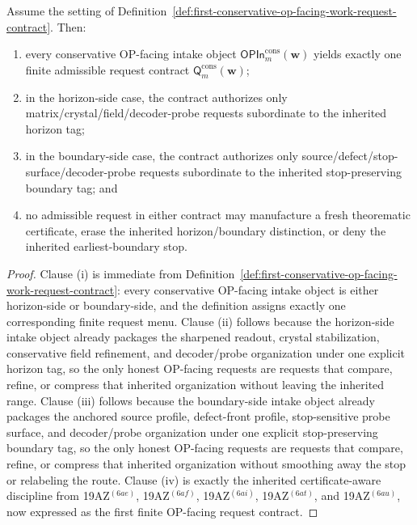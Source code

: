 \begin{proposition}
\label{prop:every-conservative-op-facing-intake-object-yields-exactly-one-finite-admissible-work-request-contract}
Assume the setting of Definition~\ref{def:first-conservative-op-facing-work-request-contract}. Then:
\begin{enumerate}[label=(\roman*)]
  \item every conservative OP-facing intake object \(\mathsf{OPIn}^{\mathrm{cons}}_{m}(\mathbf w)\) yields exactly one finite admissible request contract \(\mathsf{Q}^{\mathrm{cons}}_{m}(\mathbf w)\);
  \item in the horizon-side case, the contract authorizes only matrix/crystal/field/decoder-probe requests subordinate to the inherited horizon tag;
  \item in the boundary-side case, the contract authorizes only source/defect/stop-surface/decoder-probe requests subordinate to the inherited stop-preserving boundary tag; and
  \item no admissible request in either contract may manufacture a fresh theorematic certificate, erase the inherited horizon/boundary distinction, or deny the inherited earliest-boundary stop.
\end{enumerate}
\end{proposition}

\begin{proof}
Clause (i) is immediate from Definition~\ref{def:first-conservative-op-facing-work-request-contract}: every conservative OP-facing intake object is either horizon-side or boundary-side, and the definition assigns exactly one corresponding finite request menu. Clause (ii) follows because the horizon-side intake object already packages the sharpened readout, crystal stabilization, conservative field refinement, and decoder/probe organization under one explicit horizon tag, so the only honest OP-facing requests are requests that compare, refine, or compress that inherited organization without leaving the inherited range. Clause (iii) follows because the boundary-side intake object already packages the anchored source profile, defect-front profile, stop-sensitive probe surface, and decoder/probe organization under one explicit stop-preserving boundary tag, so the only honest OP-facing requests are requests that compare, refine, or compress that inherited organization without smoothing away the stop or relabeling the route. Clause (iv) is exactly the inherited certificate-aware discipline from 19AZ$^{(6ae)}$, 19AZ$^{(6af)}$, 19AZ$^{(6ai)}$, 19AZ$^{(6at)}$, and 19AZ$^{(6au)}$, now expressed as the first finite OP-facing request contract.
\end{proof}

